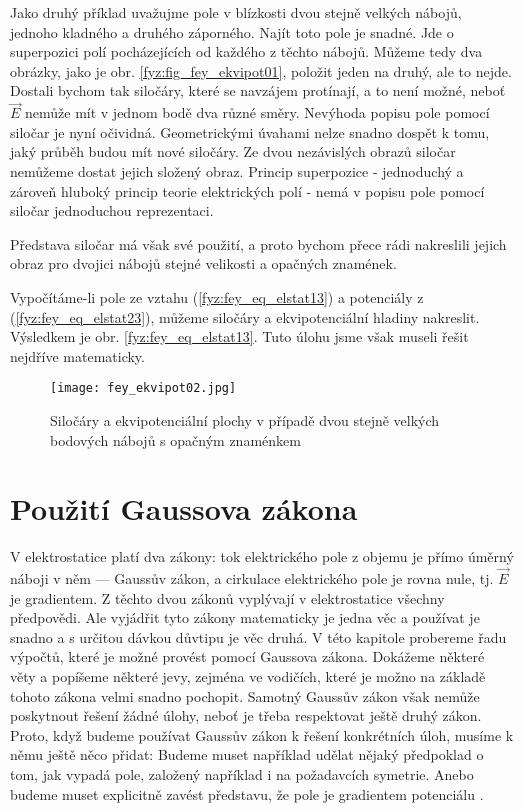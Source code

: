    Jako druhý příklad uvažujme pole v blízkosti dvou stejně velkých nábojů, jednoho kladného a 
    druhého záporného. Najít toto pole je snadné. Jde o superpozici polí pocházejících od každého z 
    těchto nábojů. Můžeme tedy dva obrázky, jako je obr. \ref{fyz:fig_fey_ekvipot01}, položit jeden 
    na druhý, ale to nejde. Dostali bychom tak siločáry, které se navzájem protínají, a to není 
    možné, neboť \(\vec{E}\) nemůže mít v jednom bodě dva různé směry. Nevýhoda popisu pole pomocí 
    siločar je nyní očividná. Geometrickými úvahami nelze snadno dospět k tomu, jaký průběh budou 
    mít nové siločáry. Ze dvou nezávislých obrazů siločar nemůžeme dostat jejich složený obraz. 
    Princip superpozice - jednoduchý a zároveň hluboký princip teorie elektrických polí - nemá v 
    popisu pole pomocí siločar jednoduchou reprezentaci.
    
    Představa siločar má však své použití, a proto bychom přece rádi nakreslili jejich obraz pro 
    dvojici nábojů stejné velikosti a opačných znamének.
    
    Vypočítáme-li pole ze vztahu (\ref{fyz:fey_eq_elstat13}) a potenciály z 
    (\ref{fyz:fey_eq_elstat23}), můžeme siločáry a ekvipotenciální hladiny nakreslit. Výsledkem je 
    obr. \ref{fyz:fey_eq_elstat13}. Tuto úlohu jsme však museli řešit nejdříve matematicky.
    \begin{figure}[ht!]
     \centering
     \texttt{[image: fey\_ekvipot02.jpg]}
     \caption[Siločáry a ekvipotenciální plochy]{Siločáry a ekvipotenciální plochy v případě dvou 
              stejně velkých bodových nábojů s opačným znaménkem}
     \label{fyz:fig_fey_ekvipot02}
    \end{figure}
  
  \section{Použití Gaussova zákona} 
    V elektrostatice platí dva zákony: tok elektrického pole z objemu je přímo úměrný náboji v něm — Gaussův 
    zákon, a cirkulace elektrického pole je rovna nule, tj. \(\vec{E}\) je gradientem. Z těchto dvou zákonů 
    vyplývají v elektrostatice všechny předpovědi. Ale vyjádřit tyto zákony matematicky je jedna věc a 
    používat je snadno a s určitou dávkou důvtipu je věc druhá. V této kapitole probereme řadu výpočtů, které 
    je možné provést pomocí Gaussova zákona. Dokážeme některé věty a popíšeme některé jevy, zejména ve 
    vodičích, které je možno na základě tohoto zákona velmi snadno pochopit. Samotný Gaussův zákon však 
    nemůže poskytnout řešení žádné úlohy, neboť je třeba respektovat ještě druhý zákon. Proto, když budeme 
    používat Gaussův zákon k řešení konkrétních úloh, musíme k němu ještě něco přidat: Budeme muset například 
    udělat nějaký předpoklad o tom, jak vypadá pole, založený například i na požadavcích symetrie. Anebo 
    budeme muset explicitně zavést představu, že pole je gradientem potenciálu \cite[s.~82]{Feynman02}.
    
